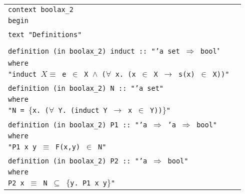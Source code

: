 \documentclass[11pt,a4paper]{article}
\newcommand{\bt}[2]{\small \begin{center}\begin{tabular}{p{#1 cm}p{#2 cm}}}
\def\et{\end{tabular}\end{center}\normalsize}
\theoremstyle{definition}
\begin{document}
\bt{14}{0}
\texttt{context boolax\_2} \\
\texttt{begin}\\
\\
\texttt{text "Definitions"}\\
\\
\texttt{definition (in boolax\_2) induct :: "'a set $\Rightarrow$ bool}" \\
\hspace{3mm} \texttt{where} \\
\hspace{3mm}\texttt{"induct $X \equiv$ e $\in$ X $\wedge$ ($\forall$ x. (x $\in$ X $\longrightarrow$ s(x) $\in$ X))"}\\
\\
\texttt{definition (in boolax\_2) N :: "'a set"} \\
\hspace{3mm} \texttt{where} \\
\hspace{3mm}\texttt{"N = $\{$x. ($\forall$ Y. (induct Y $\longrightarrow$ x $\in$ Y))$\}$"}\\
\\
\texttt{definition (in boolax\_2) P1 :: "'a $\Rightarrow$ 'a $\Rightarrow$ bool"}\\
\hspace{3mm}\texttt{where} \\
\hspace{3mm}\texttt{"P1 x y $\equiv$ F(x,y) $\in$ N"}\\
\\
\texttt{definition (in boolax\_2) P2 :: "'a $\Rightarrow$ bool"} \\
\hspace{3mm}\texttt{where} \\
\hspace{3mm}\texttt{P2 x $\equiv$ N $\subseteq$ $\{$y. P1 x y$\}$"}
\et
\end{document}
